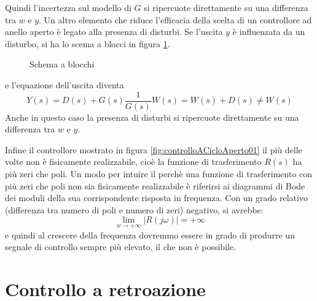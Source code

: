 \documentclass[a4paper]{report}
\begin{document}
Quindi l'incertezza sul modello di $G$ si ripercuote direttamente su
una differenza tra $w$ e $y$. Un altro elemento che riduce l'efficacia
della scelta di un controllore ad anello aperto \`e legato alla
presenza di disturbi. Se l'uscita $y$ \`e influenzata da un disturbo,
si ha lo scema a blocci in figura \ref{fig:controlloACicloAperto03}.
\begin{figure}[!hbp]
  \center
  \caption{Schema a blocchi}
  \label{fig:controlloACicloAperto03}
\end{figure}
e l'equazione dell'uscita diventa
\begin{equation}\label{eq:controlloACicloAperto05}
  Y(s) = D(s) + G(s) \dfrac{1}{G(s)} W(s) = W(s) + D(s) \neq W(s)
\end{equation}
Anche in questo caso la presenza di disturbi si ripercuote
direttamente su una differenza tra $w$ e $y$.

Infine il controllore mostrato in figura
\ref{fig:controlloACicloAperto01} il pi\`u delle volte non \`e
fisicamente realizzabile, cio\`e la funzione di trasferimento $R(s)$
ha pi\`u zeri che poli. Un modo per intuire il perch\`e una funzione
di trasferimento con pi\`u zeri che poli non sia fisicamente
realizzabile \`e riferirsi ai diagrammi di Bode dei moduli della sua
corrispondente risposta in frequenza. Con un grado relativo
(differenza tra numero di poli e numero di zeri) negativo, si avrebbe:
\[
\lim_{w \to +\infty} |R(j\omega)| = + \infty
\]
e quindi al crescere della frequenza dovremmo essere in grado di
produrre un segnale di controllo sempre pi\`u elevato, il che non \`e
possibile. 

\chapter{Controllo a retroazione}
\end{document}
